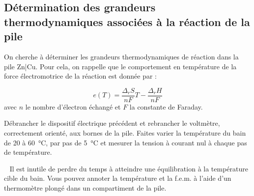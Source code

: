 \documentclass[twoside,a4paper,11pt,answers,addpoints]{exam}
\begin{document}

\subsection{Détermination des grandeurs thermodynamiques associées à la réaction de la pile}

On cherche à déterminer les grandeurs thermodynamiques de réaction dans la pile Zn|Cu. Pour cela, on rappelle que le comportement en température de la force électromotrice de la réaction est donnée par :

\begin{equation}
e (T) = \frac{\Delta_r S}{nF} T - \frac{\Delta_r H}{nF} 
\label{eq:e_T}
\end{equation}
avec $n$ le nombre d'électron échangé et $F$ la constante de Faraday.

Débrancher le dispositif électrique précédent et rebrancher le voltmètre, correctement orienté, aux bornes de la pile. Faites varier la température du bain de 20 à \SI{60}{\celsius}, par pas de \SI{5}{\celsius} et mesurer la tension à courant nul à chaque pas de température.

\faWarning ~ Il est inutile de perdre du temps à atteindre une équilibration à la température cible du bain. Vous pouvez annoter la température et la f.e.m. à l'aide d'un thermomètre plongé dans un compartiment de la pile.
\end{document}
